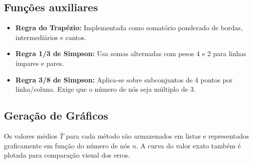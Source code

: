 \documentclass[12pt]{article}
\begin{document}
\subsection*{Funções auxiliares}

\begin{itemize}
  \item \textbf{Regra do Trapézio:} Implementada como somatório ponderado de bordas, intermediários e cantos.
  \item \textbf{Regra 1/3 de Simpson:} Usa somas alternadas com pesos 4 e 2 para linhas ímpares e pares.
  \item \textbf{Regra 3/8 de Simpson:} Aplica-se sobre subconjuntos de 4 pontos por linha/coluna. Exige que o número de nós seja múltiplo de 3.
\end{itemize}

\subsection*{Geração de Gráficos}

Os valores médios $\bar{T}$ para cada método são armazenados em listas e representados graficamente em função do número de nós $n$. A curva do valor exato também é plotada para comparação visual dos erros.
\end{document}
